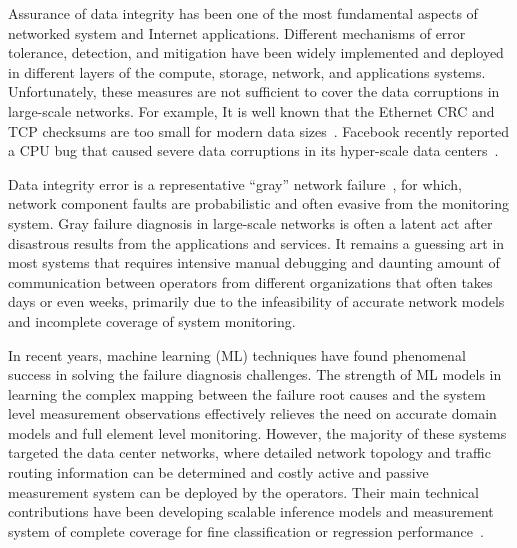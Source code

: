 Assurance of data integrity has been one of the most fundamental aspects of networked system and Internet applications. 
Different mechanisms of error tolerance, detection, and mitigation have been widely implemented and deployed in different layers of 
the compute, storage, network, and applications systems. Unfortunately, these measures are not sufficient to cover the data corruptions 
in large-scale networks. For example, It is well known that the Ethernet CRC and TCP checksums are too small for 
modern data sizes~\cite{tcp:ccr2000}. Facebook recently reported a CPU bug that caused severe data corruptions in its hyper-scale data 
centers~\cite{facebook:cpu:2021}. 


Data integrity error is a representative ``gray'' network failure~\cite{GrayFailure:2017}, for which, 
network component faults are probabilistic and often evasive from the monitoring system. Gray failure diagnosis in large-scale networks 
is often a latent act after disastrous results from the applications and services. It remains a guessing art in most systems that requires intensive 
manual debugging and daunting amount of communication between operators 
from different organizations that often takes days or even weeks, primarily due to the infeasibility of accurate network models and 
incomplete coverage of system monitoring. 

In recent years, machine learning (ML) techniques have found phenomenal success in solving the failure diagnosis challenges.
The strength of ML models in learning the complex mapping between the failure root causes and the system level measurement 
observations effectively relieves the need on accurate domain models and full element level monitoring.  However, the majority of 
these systems targeted the data center networks, where detailed network topology and traffic routing information can be determined and 
costly active and passive measurement system can be deployed by the operators. Their main 
technical contributions have been developing scalable inference models and measurement system of complete coverage for 
fine classification or regression performance~\cite{netbouncer:nsdi18,DeepView:NSDI18,arzani2018democratically}.

